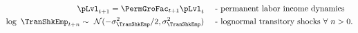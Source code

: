   \begin{equation}\begin{gathered}\begin{aligned}
         \pLvl_{t+1}  = \PermGroFac_{t+1}\pLvl_{t}  &  \text{~~~ - permanent labor income dynamics} \label{eq:permincgrow}
        \\ \log ~ \TranShkEmp_{t+n} \sim ~\mathcal{N}(-\sigma_{\TranShkEmp}^{2}/2,\sigma_{\TranShkEmp}^{2}) & \text{~~~ - lognormal transitory shocks}~\forall~n>0 .
      \end{aligned}\end{gathered}\end{equation}

